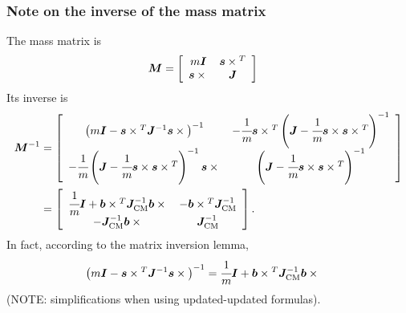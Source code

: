 \documentclass[10pt,fleqn,subeqn]{report}
\newcommand{\T}[1]{\bm{#1}}
\newcommand{\TT}[1]{\bm{#1}}
\begin{document}
\subsubsection{Note on the inverse of the mass matrix}
The mass matrix is
\begin{align}
	\TT{M}
	&=
	\sqbr{\matr{cc}{
		m \TT{I} & \T{s}\times{}^T
		\\
		\T{s}\times{} & \TT{J}
	}}
\end{align}
Its inverse is
\begin{align}
	\TT{M}^{-1}
	&=
	\sqbr{\matr{cc}{
		\plbr{
			m \TT{I}
			-
			\T{s}\times{}^T \TT{J}^{-1} \TT{s}\times{}
		}^{-1}
		&
		-\cfrac{1}{m}\T{s}\times{}^T \plbr{
			\TT{J}
			-
			\cfrac{1}{m} \T{s}\times \T{s} \times{}^T
		}^{-1}
		\\
		-\cfrac{1}{m} \plbr{
			\TT{J}
			-
			\cfrac{1}{m} \T{s}\times \T{s} \times{}^T
		}^{-1} \T{s}\times{}
		&
		\plbr{
			\TT{J}
			-
			\cfrac{1}{m} \T{s}\times \T{s}\times{}^T
		}^{-1}
	}}
	\nonumber \\
	&=
	\sqbr{\matr{cc}{
		\cfrac{1}{m} \TT{I}
		+
		\T{b}\times{}^T \TT{J}_\text{CM}^{-1} \T{b}\times{}
		&
		-\T{b}\times{}^T \TT{J}_\text{CM}^{-1}
		\\
		- \TT{J}_\text{CM}^{-1}\T{b}\times{}
		&
		\TT{J}_\text{CM}^{-1}
	}}
	.
\end{align}
In fact, according to the matrix inversion lemma,
\begin{align}
	\plbr{
		m \TT{I}
		-
		\T{s} \times{}^T \TT{J}^{-1} \T{s}\times{}
	}^{-1}
	&=
	\cfrac{1}{m} \TT{I}
	+
	\T{b}\times{}^T \TT{J}_\text{CM}^{-1} \T{b}\times{}
\end{align}
(NOTE: simplifications when using updated-updated formulas).
\end{document}
